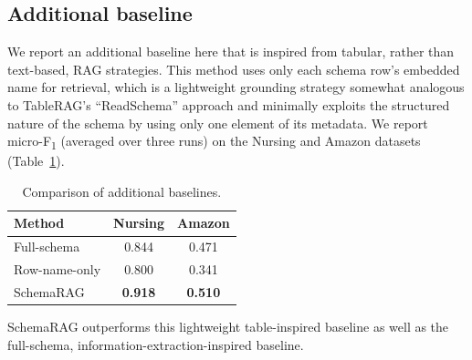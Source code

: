 \subsection{Additional baseline}
We report an additional baseline here that is inspired from tabular, rather than text-based, RAG strategies. This method uses only each schema row’s embedded name for retrieval, which is a lightweight grounding strategy somewhat analogous to TableRAG’s ``ReadSchema'' approach \cite{chen2024tablerag} and minimally exploits the structured nature of the schema by using only one element of its metadata. We report micro-F\textsubscript{1} (averaged over three runs) on the Nursing and Amazon datasets (Table~\ref{tab:additional_baseline}).

\begin{table}[ht]
    \centering
    \caption{Comparison of additional baselines.}
    \label{tab:additional_baseline}
    \begin{tabular}{lcc}
        \toprule
        \textbf{Method} & \textbf{Nursing} & \textbf{Amazon} \\
        \midrule
        Full-schema & 0.844 & 0.471 \\ 
        Row-name-only & 0.800 & 0.341 \\ 
        SchemaRAG & \textbf{0.918} & \textbf{0.510} \\ 
        \bottomrule
    \end{tabular}
\end{table}

SchemaRAG outperforms this lightweight table-inspired baseline as well as the full-schema, information-extraction-inspired baseline.